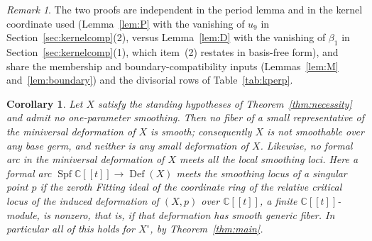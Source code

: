 \documentclass[11pt]{amsart}
\newtheorem{corollary}[theorem]{Corollary}
\theoremstyle{definition}
\theoremstyle{remark}
\newtheorem{remark}[theorem]{Remark}
\theoremstyle{plain}
\newcommand{\CC}{\mathbb{C}}
\newcommand{\Def}{\operatorname{Def}}
\begin{document}
\begin{remark}\label{rem:independence}
The two proofs are independent in the period lemma and in the
kernel coordinate used (Lemma~\ref{lem:P} with the vanishing of $u_9$ in
Section~\ref{sec:kernelcomp}(2), versus Lemma~\ref{lem:D} with the vanishing
of $\beta_1$ in Section~\ref{sec:kernelcomp}(1), which item~(2) restates in
basis-free form), and share the membership and
boundary-compatibility inputs (Lemmas~\ref{lem:M}
and~\ref{lem:boundary}) and the divisorial rows of
Table~\ref{tab:kperp}.
\end{remark}

\begin{corollary}\label{cor:def}
Let $X$ satisfy the standing hypotheses of Theorem~\ref{thm:necessity} and
admit no one-parameter smoothing.  Then no fiber of a small representative
of the miniversal deformation of $X$ is smooth; consequently $X$ is not
smoothable over any base germ, and neither is any small deformation of $X$.
Likewise, no formal arc in the miniversal deformation of $X$ meets all the
local smoothing loci.  Here a formal arc $\operatorname{Spf}\CC[[t]]\to\Def(X)$
\emph{meets the smoothing locus} of a singular point $p$ if the zeroth Fitting
ideal of the coordinate ring of the relative critical locus of the induced
deformation of $(X,p)$ over $\CC[[t]]$, a finite $\CC[[t]]$-module, is nonzero, that is, if that
deformation has smooth generic fiber.  In particular all of this holds for
$X^{\circ}$, by Theorem~\ref{thm:main}.
\end{corollary}
\end{document}

